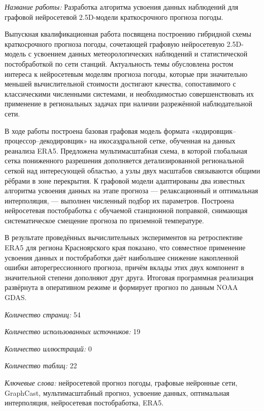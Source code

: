 \documentclass[14pt,a4paper]{extarticle}
\numberwithin{table}{section}
\numberwithin{figure}{section}
\numberwithin{equation}{section}
\begin{document}
\textit{Название работы:} Разработка алгоритма усвоения данных
наблюдений для графовой нейросетевой 2.5D-модели краткосрочного
прогноза погоды.

Выпускная квалификационная работа посвящена построению гибридной схемы
краткосрочного прогноза погоды, сочетающей графовую нейросетевую
2.5D-модель с усвоением данных метеорологических наблюдений и
статистической постобработкой по сети станций. Актуальность темы
обусловлена ростом интереса к нейросетевым моделям прогноза погоды,
которые при значительно меньшей вычислительной стоимости достигают качества, сопоставимого с
классическими численными системами, и необходимостью совершенствовать
их применение в региональных задачах при наличии разрежённой
наблюдательной сети.

В ходе работы построена базовая графовая модель формата
«кодировщик--процессор--декодировщик» на икосаэдральной сетке,
обученная на данных реанализа ERA5. Предложена мультимасштабная схема,
в которой глобальная сетка пониженного разрешения дополняется
детализированной региональной сеткой над интересующей областью, а
узлы двух масштабов связываются общими рёбрами в зоне перекрытия. К
графовой модели адаптированы два известных алгоритма усвоения данных
на этапе прогноза --- релаксационный и оптимальная
интерполяция, --- выполнен численный подбор их параметров. Построена
нейросетевая постобработка с обучаемой станционной поправкой, снимающая
систематическое смещение прогноза по приземной температуре.

В результате проведённых вычислительных экспериментов на ретроспективе
ERA5 для региона Красноярского края показано, что совместное применение
усвоения данных и постобработки даёт наибольшее снижение накопленной
ошибки авторегрессионного прогноза, причём вклады этих двух компонент в
значительной степени дополняют друг друга. Итоговая программная
реализация развёрнута в оперативном режиме и формирует прогноз по
данным NOAA GDAS.

\textit{Количество страниц:} 54

\textit{Количество использованных источников:} 19

\textit{Количество иллюстраций:} 0

\textit{Количество таблиц:} 22

\textit{Ключевые слова:} нейросетевой прогноз погоды, графовые
нейронные сети, GraphCast, мультимасштабный прогноз, усвоение данных,
оптимальная интерполяция, нейросетевая постобработка, ERA5.


\newpage
\end{document}
